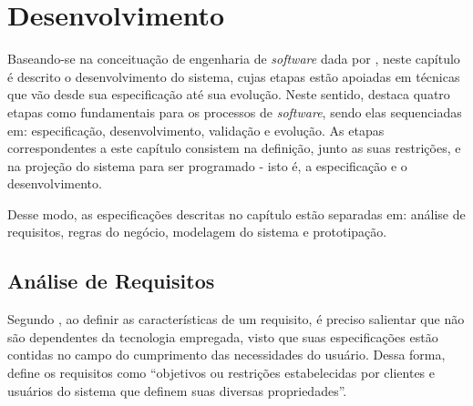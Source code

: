 








\chapter{Desenvolvimento}
  Baseando-se na conceituação de engenharia de \textsl{software} dada por , neste capítulo é descrito o desenvolvimento do sistema, cujas etapas estão apoiadas em técnicas que vão desde sua especificação até sua evolução. Neste sentido,  destaca quatro etapas como fundamentais para os processos de \textsl{software}, sendo elas sequenciadas em: especificação, desenvolvimento, validação e evolução. As etapas correspondentes a este capítulo consistem na definição, junto as suas restrições, e na projeção do sistema para ser programado - isto é, a especificação e o desenvolvimento.
  
  Desse modo, as especificações descritas no capítulo estão separadas em: análise de requisitos, regras do negócio, modelagem do sistema e prototipação.



\section{Análise de Requisitos}
Segundo , ao definir as características de um requisito, é preciso salientar que não são dependentes da tecnologia empregada, visto que suas especificações estão contidas no campo do cumprimento das necessidades do usuário. Dessa forma,   define os requisitos como ``objetivos ou restrições estabelecidas por clientes e usuários do sistema que definem suas diversas propriedades''.

